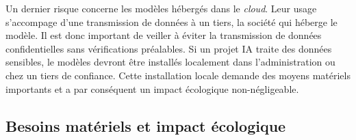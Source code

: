 	Un dernier risque concerne les modèles hébergés dans le \emph{cloud}.
	Leur usage s'accompage d'une transmission de données à un tiers, la société 
	qui héberge le modèle. Il est donc important de veiller à éviter la transmission 
	de données confidentielles sans vérifications préalables. Si un projet IA traite des données sensibles,
	le modèles devront être installés localement dans l'administration ou chez
	 un tiers de confiance. 
	 Cette installation locale demande des moyens matériels importants et 
	 a par conséquent un impact écologique non-négligeable.
	

	\subsection{Besoins matériels et impact écologique}
		
